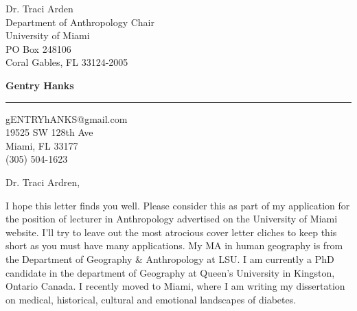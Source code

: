 \documentclass[10.5pt]{letter} %
\begin{document}
\begin{letter}{Dr. Traci Arden \\
Department of Anthropology Chair \\
University of Miami \\
PO Box 248106 \\
Coral Gables, FL 33124-2005}


\begin{flushright}
\large\bf Gentry Hanks \\ %
\vspace{15pt} \hrule height 1pt %
gENTRYhANKS@gmail.com \\
19525 SW 128th Ave \\ 
Miami, FL 33177 \\ 
(305) 504-1623 \\%
\end{flushright} 

\signature{Gentry Hanks} %


\opening{Dr. Traci Ardren,} 

I hope this letter finds you well. Please consider this as part of my application for the position of lecturer in Anthropology advertised on the University of Miami website. I'll try to leave out the most atrocious cover letter cliches to keep this short as you must have many applications. My MA in human geography is from the Department of Geography \& Anthropology at LSU. I am currently a PhD candidate in the department of Geography at Queen's University in Kingston, Ontario Canada. I recently moved to Miami, where I am writing my dissertation on medical, historical, cultural and emotional landscapes of diabetes.


\end{letter}
\end{document}
